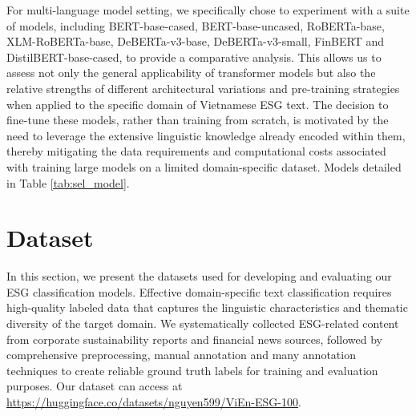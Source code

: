 \documentclass[12pt, letterpaper]{template}
\newcommand{\revise}[1]{{\color{magenta}[#1]}}
\begin{document}
For multi-language model setting, we specifically chose to experiment with a suite of models, including BERT-base-cased, BERT-base-uncased, RoBERTa-base, XLM-RoBERTa-base, DeBERTa-v3-base, DeBERTa-v3-small, FinBERT and DistilBERT-base-cased, to provide a comparative analysis. This allows us to assess not only the general applicability of transformer models but also the relative strengths of different architectural variations and pre-training strategies when applied to the specific domain of Vietnamese ESG text. The decision to fine-tune these models, rather than training from scratch, is motivated by the need to leverage the extensive linguistic knowledge already encoded within them, thereby mitigating the data requirements and computational costs associated with training large models on a limited domain-specific dataset.
Models detailed in Table \ref{tab:sel_model}.



\section{Dataset} \label{dataset}






In this section, we present the datasets used for developing and evaluating our ESG classification models. Effective domain-specific text classification requires high-quality labeled data that captures the linguistic characteristics and thematic diversity of the target domain. We systematically collected ESG-related content from corporate sustainability reports and financial news sources, followed by comprehensive preprocessing, manual annotation and many annotation techniques to create reliable ground truth labels for training and evaluation purposes. Our dataset can access at \href{https://huggingface.co/datasets/nguyen599/ViEn-ESG-100}{https://huggingface.co/datasets/nguyen599/ViEn-ESG-100}.
\end{document}

